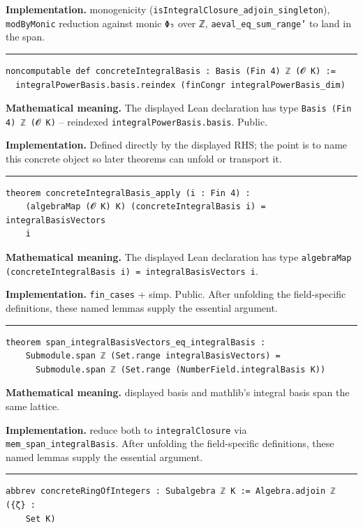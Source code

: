 \documentclass[UTF8,a4paper,11pt,fontset=fandol]{ctexart}
\theoremstyle{definition}
\newcommand{\statementsep}{\par\medskip\hrule\medskip}
\begin{document}
\noindent\textbf{Implementation.} monogenicity (\texttt{isIntegralClosure\_\allowbreak{}adjoin\_\allowbreak{}singleton}), \texttt{modByMonic} reduction against monic \texttt{Φ₅} over ℤ, \texttt{aeval\_\allowbreak{}eq\_\allowbreak{}sum\_\allowbreak{}range'} to land in the span.\par
\statementsep
\begin{verbatim}
noncomputable def concreteIntegralBasis : Basis (Fin 4) ℤ (𝓞 K) :=
  integralPowerBasis.basis.reindex (finCongr integralPowerBasis_dim)
\end{verbatim}
\noindent\textbf{Mathematical meaning.} The displayed Lean declaration has type \texttt{Basis (Fin 4) ℤ (𝓞 K)} -- reindexed \texttt{integralPowerBasis.\allowbreak{}basis}. Public.\par
\noindent\textbf{Implementation.} Defined directly by the displayed RHS; the point is to name this concrete object so later theorems can unfold or transport it.\par
\statementsep
\begin{verbatim}
theorem concreteIntegralBasis_apply (i : Fin 4) :
    (algebraMap (𝓞 K) K) (concreteIntegralBasis i) = integralBasisVectors
    i
\end{verbatim}
\noindent\textbf{Mathematical meaning.} The displayed Lean declaration has type \texttt{algebraMap (concreteIntegralBasis i) = integralBasisVectors i}.\par
\noindent\textbf{Implementation.} \texttt{fin\_\allowbreak{}cases} + simp. Public. After unfolding the field-specific definitions, these named lemmas supply the essential argument.\par
\statementsep
\begin{verbatim}
theorem span_integralBasisVectors_eq_integralBasis :
    Submodule.span ℤ (Set.range integralBasisVectors) =
      Submodule.span ℤ (Set.range (NumberField.integralBasis K))
\end{verbatim}
\noindent\textbf{Mathematical meaning.} displayed basis and mathlib's integral basis span the same lattice.\par
\noindent\textbf{Implementation.} reduce both to \texttt{integralClosure} via \texttt{mem\_\allowbreak{}span\_\allowbreak{}integralBasis}. After unfolding the field-specific definitions, these named lemmas supply the essential argument.\par
\statementsep
\begin{verbatim}
abbrev concreteRingOfIntegers : Subalgebra ℤ K := Algebra.adjoin ℤ ({ζ} :
    Set K)
\end{verbatim}
\end{document}
